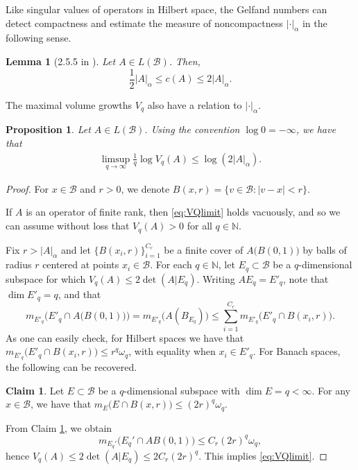 \documentclass[11pt]{amsart}
\theoremstyle{theorem}
\newtheorem{lem}[thm]{Lemma}
\newtheorem{prop}[thm]{Proposition}
\theoremstyle{definition}
\newtheorem{cla}[thm]{Claim}
\numberwithin{equation}{section}
\newcommand{\N}{\mathbb{N}}
\renewcommand{\a}{\alpha}
\newcommand{\Bc}{\mathcal{B}}
\begin{document}
Like singular values of operators in Hilbert space, the Gelfand numbers can detect compactness and estimate the measure of noncompactness $|\cdot|_{\a}$ in the following sense. 

\begin{lem}[2.5.5 in \cite{Akhmerov}]\label{lem:gelfandNoncompact}
Let $A \in L(\Bc)$. Then,
\[
\frac{1}{2} |A|_{\a} \leq c(A) \leq 2 |A|_{\a}.
\]
\end{lem}

The maximal volume growths $V_q$ also have a relation to $|\cdot|_{\a}$. 
\begin{prop} \label{lem:maxVolNoncompact}
Let $A \in L(\Bc)$. Using the convention $\log 0 =  - \infty$, we have that
\begin{align}\label{eq:VQlimit}
\limsup_{q \to \infty} \frac{1}{q} \log V_q(A) \leq \log ( 2 |A|_{\a}).
\end{align}
\end{prop}
\begin{proof}
For $x \in \Bc$ and $r > 0$, we denote $B(x, r) = \{v \in \Bc : |v - x| < r\}$.

If $A$ is an operator of finite rank, then \eqref{eq:VQlimit} holds vacuously, and so we can assume without loss that $V_q(A) > 0$ for all $q \in \N$.

Fix $r > |A|_{\a}$ and let $\{B(x_i, r)\}_{i = 1}^{C_r}$ be a finite cover of $A\big( B(0,1)\big)$ by balls of radius $r$ centered at points $x_i \in \Bc$. For each $q \in \N$, let $E_q \subset \Bc$ be a $q$-dimensional subspace for which $V_q(A) \leq 2 \det(A | E_q)$. Writing $A E_q = E'_q$, note that $\dim E'_q = q$, and that
\[
m_{E'_q} \bigg( E'_q \cap A \big( B(0,1) \big) \bigg) = m_{E'_q} \big( A (B_{E_q}) \big) \leq  \sum_{i = 1}^{C_r} m_{E'_q} \big( E'_q \cap B(x_i, r) \big).
\]
As one can easily check, for Hilbert spaces we have that $m_{E'_q} \big( E'_q \cap B(x_i, r) \big) \leq  r^q \omega_q$, with equality when $x_i \in E'_q$. For Banach spaces, the following can be recovered.
\begin{cla}\label{cla:ballVolEst}
Let $E \subset \Bc$ be a $q$-dimensional subspace with $\dim E = q < \infty$. For any $x \in \Bc$, we have that $m_E \big( E \cap B(x, r) \big) \leq (2 r)^q \omega_q$.
\end{cla}
From Claim \ref{cla:ballVolEst}, we obtain
\[
m_{E_q'} \big( E_q' \cap A B(0,1)\big) \leq C_r (2 r)^q \omega_q,
\]
hence $V_q(A) \leq 2 \det(A | E_q) \leq  2C_r (2 r)^q$. This implies \eqref{eq:VQlimit}.
\end{proof}
\end{document}
